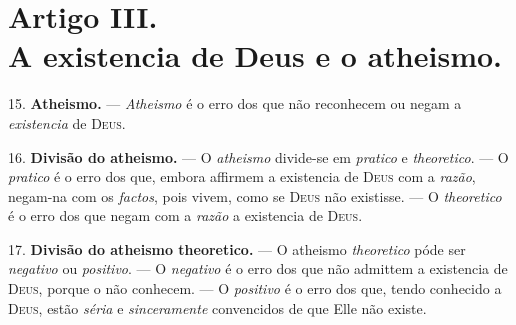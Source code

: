 

\section*{Artigo III.\\ A existencia de Deus e o atheismo.}

15. \textbf{Atheismo.} --- \emph{Atheismo} é o erro dos que não reconhecem ou negam a \emph{existencia} de \textsc{Deus}.

16. \textbf{Divisão do atheismo.} --- O \emph{atheismo} divide-se em \emph{pratico} e \emph{theoretico}. --- O \emph{pratico} é o erro dos que, embora affirmem a existencia de \textsc{Deus} com a \emph{razão}, negam-na com os \emph{factos}, pois vivem, como se \textsc{Deus} não existisse. --- O \emph{theoretico} é o erro dos que negam com a \emph{razão} a existencia de \textsc{Deus}.

17. \textbf{Divisão do atheismo theoretico.} --- O atheismo \emph{theoretico} póde ser \emph{negativo} ou \emph{positivo}. --- O \emph{negativo} é o erro dos que não admittem a existencia de \textsc{Deus}, porque o não conhecem. --- O \emph{positivo} é o erro dos que, tendo conhecido a \textsc{Deus}, estão \emph{séria} e \emph{sinceramente} convencidos de que Elle não existe.

